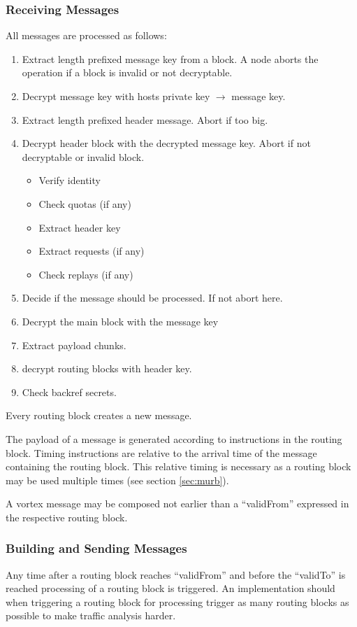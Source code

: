 \subsubsection{Receiving Messages}
All messages are processed as follows:
\begin{enumerate}
	\item Extract length prefixed message key from a block. A node aborts the operation if a block is invalid or not decryptable.
	\item Decrypt message key with hosts private key $\rightarrow$ message key.
	\item Extract length prefixed header message. Abort if too big.
	\item Decrypt header block with the decrypted message key. Abort if not decryptable or invalid block.
	\begin{itemize}
		\item Verify identity
		\item Check quotas (if any)
		\item Extract header key
		\item Extract requests (if any)
		\item Check replays (if any)
	\end{itemize}
	\item Decide if the message should be processed. If not abort here.
	\item Decrypt the main block with the message key
	\item Extract payload chunks.
	\item decrypt routing blocks with header key.
	\item Check backref secrets.
\end{enumerate}

Every routing block creates a new message.

The payload of a message is generated according to instructions in the routing block. Timing instructions are relative to the arrival time of the message containing the routing block. This relative timing is necessary as a routing block may be used multiple times (see section \ref{sec:murb}).

A vortex message may be composed not earlier than a ``validFrom'' expressed in the respective routing block.

\subsubsection{Building and Sending Messages}
Any time after a routing block reaches ``validFrom'' and before the ``validTo'' is reached processing of a routing block is triggered. An implementation should when triggering a routing block for processing trigger as many routing blocks as possible to make traffic analysis harder.


